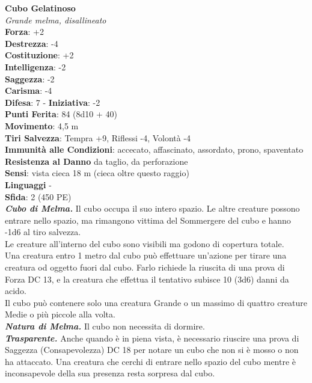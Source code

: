 \begin{multicols}{2}
\medskip\textbf{Cubo Gelatinoso}\\
\emph{Grande melma, disallineato}\\
\textbf{Forza}: +2\\
\textbf{Destrezza}: -4\\
\textbf{Costituzione}: +2\\
\textbf{Intelligenza}: -2\\
\textbf{Saggezza}: -2\\
\textbf{Carisma}: -4\\
\textbf{Difesa}: 7 - \textbf{Iniziativa}: -2\\
\textbf{Punti Ferita}: 84 (8d10 + 40)\\
\textbf{Movimento}: 4,5 m\\
\textbf{Tiri Salvezza}: Tempra +9, Riflessi -4, Volontà -4\\
\textbf{Immunità alle Condizioni}: accecato, affascinato, assordato, prono, spaventato\\
\textbf{Resistenza al Danno} da taglio, da perforazione\\
\textbf{Sensi}: vista cieca 18 m (cieca oltre questo raggio)\\
\textbf{Linguaggi} -\\
\textbf{Sfida}: 2 (450 PE)\smallskip\\
\emph{\textbf{Cubo di Melma.}} Il cubo occupa il suo intero spazio. Le altre creature possono entrare nello spazio, ma rimangono vittima del Sommergere del cubo e hanno -1d6 al tiro salvezza.\\

Le creature all'interno del cubo sono visibili ma godono di copertura totale.\\

Una creatura entro 1 metro dal cubo può effettuare un'azione per tirare una creatura od oggetto fuori dal cubo. Farlo richiede la riuscita di una prova di Forza DC  13, e la creatura che effettua il tentativo subisce 10 (3d6) danni da acido.\\

Il cubo può contenere solo una creatura Grande o un massimo di quattro creature Medie o più piccole alla volta.\\

\emph{\textbf{Natura di Melma.}} Il cubo non necessita di dormire.\\

\emph{\textbf{Trasparente.}} Anche quando è in piena vista, è necessario riuscire una prova di Saggezza (Consapevolezza) DC  18 per notare un cubo che non si è mosso o non ha attaccato. Una creatura che cerchi di entrare nello spazio del cubo mentre è inconsapevole della sua presenza resta sorpresa dal cubo.\\


\end{multicols}

